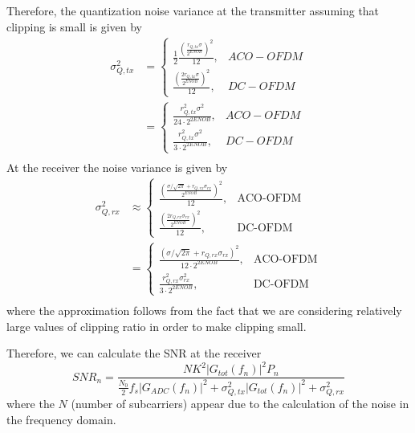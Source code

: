 \documentclass[a4paper]{article}
\begin{document}
Therefore, the quantization noise variance at the transmitter assuming that clipping is small is given by
\begin{align} \nonumber
\sigma^2_{Q, tx} &= \begin{cases}
\frac{1}{2}\frac{(\frac{r_{Q,tx}\sigma}{2^{ENOB}})^2}{12}, & ACO-OFDM \\
\frac{(\frac{2r_{Q,tx}\sigma}{2^{ENOB}})^2}{12}, & DC-OFDM 
\end{cases} \\ \nonumber 
& = \begin{cases}
\frac{r_{Q,tx}^2\sigma^2}{24\cdot 2^{2ENOB}}, & ACO-OFDM \\
\frac{r_{Q,tx}^2\sigma^2}{3\cdot 2^{2ENOB}}, & DC-OFDM 
\end{cases}\\ \nonumber 
\end{align}At the receiver the noise variance is given by
\begin{align} \nonumber
\sigma^2_{Q,rx} & \approx \begin{cases}
\frac{(\frac{\sigma/\sqrt{2\pi} + r_{Q,rx}\sigma_{rx}}{2^{ENOB}})^2}{12}, & \text{ACO-OFDM} \\
\frac{(\frac{2r_{Q,rx}\sigma_{rx}}{2^{ENOB}})^2}{12}, & \text{DC-OFDM}
\end{cases} \\ \nonumber
& = \begin{cases}
\frac{(\sigma/\sqrt{2\pi} + r_{Q,rx}\sigma_{rx})^2}{12\cdot 2^{2ENOB}}, & \text{ACO-OFDM} \\
\frac{r_{Q,rx}^2\sigma_{rx}^2}{3\cdot 2^{2ENOB}}, & \text{DC-OFDM}
\end{cases} \\
\end{align}
where the approximation follows from the fact that we are considering relatively large values of clipping ratio in order to make clipping small.

Therefore, we can calculate the SNR at the receiver
\begin{equation}
SNR_n = \frac{NK^2|G_{tot}(f_n)|^2P_n}{\frac{N_0}{2}f_s|G_{ADC}(f_n)|^2 + \sigma_{Q,tx}^2|G_{tot}(f_n)|^2 + \sigma_{Q,rx}^2}
\end{equation}
where the $N$ (number of subcarriers) appear due to the calculation of the noise in the frequency domain. 
\end{document}
